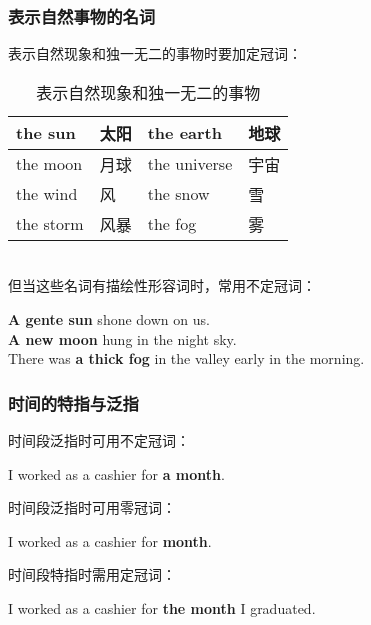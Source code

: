 \documentclass[UTF8]{ctexart}
\begin{document}
\subsubsection{表示自然事物的名词}
    表示自然现象和独一无二的事物时要加定冠词：
    \begin{table}[h!]
        \begin{center}
            \ttfamily
            \begin{tabular}{p{70pt}|p{40pt}|p{70pt}|p{40pt}}
                \hline
                the sun&太阳&the earth&地球\\ \hline
                the moon&月球&the universe&宇宙\\ \hline
                the wind&风&the snow&雪\\ \hline
                the storm&风暴&the fog&雾\\ \hline
            \end{tabular}
            \rmfamily
            \caption{表示自然现象和独一无二的事物}
        \end{center}
    \end{table}\\
    但当这些名词有描绘性形容词时，常用不定冠词：
    \begin{center}
        \large\ttfamily
        \textbf{A gente sun} shone down on us.\\[3mm]
        \textbf{A new moon} hung in the night sky.\\[3mm]
        There was \textbf{a thick fog} in the valley early in the morning.
    \end{center}

\newpage

\subsubsection{时间的特指与泛指}
    时间段泛指时可用不定冠词：
    \begin{center}
        \large\ttfamily
        I worked as a cashier for \textbf{a month}.\\[4mm]
    \end{center}
    时间段泛指时可用零冠词：
    \begin{center}
        \large\ttfamily
        I worked as a cashier for \textbf{month}.\\[4mm]
    \end{center}
    时间段特指时需用定冠词：
    \begin{center}
        \large\ttfamily
        I worked as a cashier for \textbf{the month} I graduated.
    \end{center}\vspace{5pt}
\end{document}
